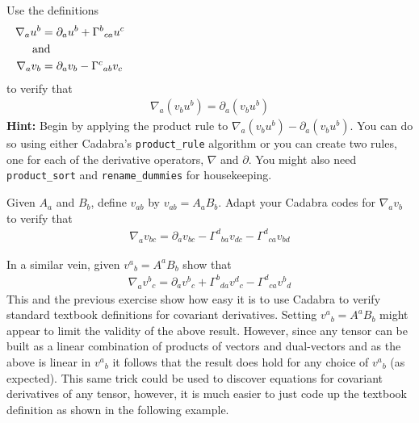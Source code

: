 \documentclass[a4paper,12pt]{article}
\numberwithin{equation}{section}%
\begin{document}
\begin{Exercises}

   \begin{Exercise}
      Use the definitions
      \begin{align*}
         \nabla_{a} u^b &= \partial_{a} u^b + \Gamma^{b}{}_{ca} u^c\\
         \noalign{and}
         \nabla_{a} v_b &= \partial_{a} v_b - \Gamma^{c}{}_{ab} v_c
      \end{align*}
      to verify that
      \begin{align*}
         \nabla_{a}\left(v_b u^b\right) = \partial_{a}\left(v_b u^b\right)
      \end{align*}
      {\bf Hint:} Begin by applying the product rule to $\nabla_{a}\left(v_b
      u^b\right)-\partial_{a}\left(v_b u^b\right)$. You can do so using either Cadabra's
      \verb|product_rule| algorithm or you can create two rules, one for each of the
      derivative operators, $\nabla$ and $\partial$. You might also need \verb|product_sort|
      and \verb|rename_dummies| for housekeeping.

   \end{Exercise}

   \begin{Exercise}
      Given $A_a$ and $B_b$, define $v_{ab}$ by $v_{ab} = A_a B_b$. Adapt your Cadabra
      codes for $\nabla_{a} v_b$ to verify that
      \begin{align*}
         \nabla_{a}{v_{bc}} = \partial_{a}{v_{bc}}
                            - \Gamma^{d}{}_{ba} v_{dc}
                            - \Gamma^{d}{}_{ca} v_{bd}
      \end{align*}
   \end{Exercise}

   \begin{Exercise}
      In a similar vein, given $v^{a}{}_{b} = A^{a} B_{b}$ show that
      \begin{align*}
         \nabla_{a}{v^{b}{}_{c}} = \partial_{a}{v^{b}{}_{c}}
                                 + \Gamma^{b}{}_{da} v^{d}{}_{c}
                                 - \Gamma^{d}{}_{ca} v^{b}{}_{d}
      \end{align*}
      This and the previous exercise show how easy it is to use Cadabra to verify standard
      textbook definitions for covariant derivatives. Setting $v^{a}{}_{b} = A^{a} B_{b}$
      might appear to limit the validity of the above result. However, since any tensor can
      be built as a linear combination of products of vectors and dual-vectors and as the
      above is linear in $v^{a}{}_{b}$ it follows that the result does hold for any choice
      of $v^{a}{}_{b}$ (as expected). This same trick could be used to discover equations
      for covariant derivatives of any tensor, however, it is much easier to just code up
      the textbook definition as shown in the following example.
   \end{Exercise}


\end{Exercises}
\end{document}
